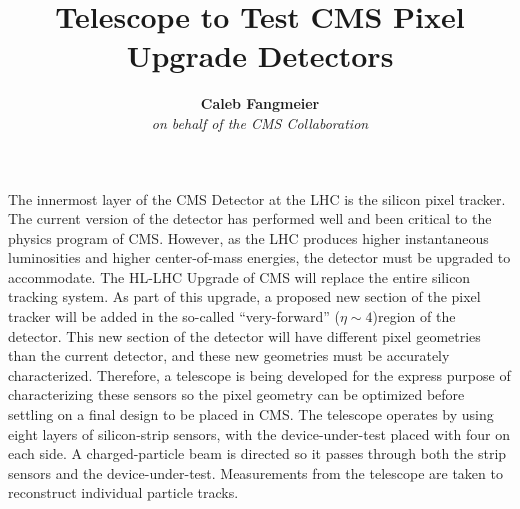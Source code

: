 \documentclass[final]{beamer}
\title{Telescope to Test CMS Pixel Upgrade Detectors} %
\author{\textbf{Caleb Fangmeier} \\
  \textit{on behalf of the CMS Collaboration}} %
\institute{Department of Physics \& Astronomy \\ \textit{University of Nebraska \-- Lincoln}} %
\begin{document}

\setlength{\belowcaptionskip}{2ex} %
\setlength\belowdisplayshortskip{2ex} %

\begin{frame}[t] %
  \small
  The innermost layer of the CMS Detector at the LHC is the silicon pixel tracker. The current version of the detector has performed well and been critical to the physics program of CMS\@.  However, as the LHC produces higher instantaneous luminosities and higher center-of-mass energies, the detector must be upgraded to accommodate. The HL-LHC Upgrade of CMS will replace the entire silicon tracking system.  As part of this upgrade, a proposed new section of the pixel tracker will be added in the so-called ``very-forward'' ($\eta\sim4$)region of the detector.  This new section of the detector will have different pixel geometries than the current detector, and these new geometries must be accurately characterized.  Therefore, a telescope is being developed for the express purpose of characterizing these sensors so the pixel geometry can be optimized before settling on a final design to be placed in CMS\@.
The telescope operates by using eight layers of silicon-strip sensors, with the device-under-test placed with four on each side. A charged-particle beam is directed so it passes through both the strip sensors and the device-under-test. Measurements from the telescope are taken to reconstruct individual particle tracks.
  
\vspace{.2in}


\end{frame}
\end{document}
